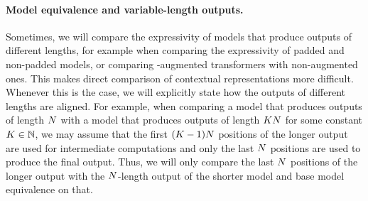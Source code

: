 \paragraph{Model equivalence and variable-length outputs.}
Sometimes, we will compare the expressivity of models that produce outputs of different lengths, for example when comparing the expressivity of padded and non-padded models, or comparing \CoTAcr-augmented transformers with non-augmented ones.
This makes direct comparison of contextual representations more difficult.
Whenever this is the case, we will explicitly state how the outputs of different lengths are aligned.
For example, when comparing a model that produces outputs of length ${{N}}$ with a model that produces outputs of length $K {{N}}$ for some constant $K \in {{\mathbb{N}}}$, we may assume that the first $(K - 1) {{N}}$ positions of the longer output are used for intermediate computations and only the last ${{N}}$ positions are used to produce the final output.
Thus, we will only compare the last ${{N}}$ positions of the longer output with the ${{N}}$-length output of the shorter model and base model equivalence on that.

